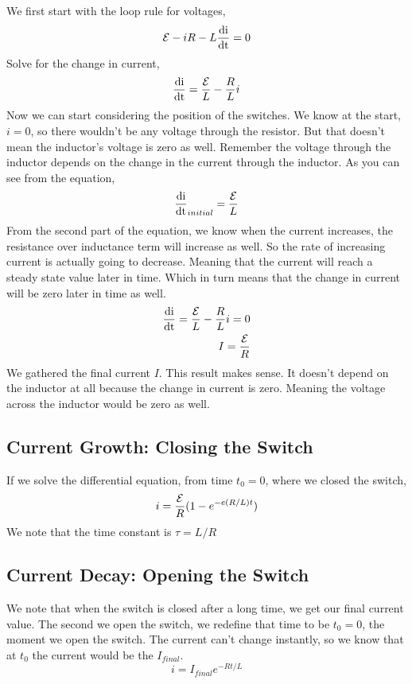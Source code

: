 We first start with the loop rule for voltages, 
\begin{equation*}
	\mathcal{E} - iR - L\frac{\mathrm{d i}}{\mathrm{d t}} = 0
\end{equation*}
Solve for the change in current, 
\begin{equation*}
	\frac{\mathrm{d i}}{\mathrm{d t}} = \frac{\mathcal{E}}{L} - \frac{R}{L}i
\end{equation*}
Now we can start considering the position of the switches. We know at the start, $i=0$, so there wouldn't be any voltage through the resistor. But that doesn't mean the inductor's voltage is zero as well. Remember the voltage through the inductor depends on the change in the current through the inductor. As you can see from the equation, 
\begin{equation*}
	\frac{\mathrm{d i}}{\mathrm{d t}}_{initial} = \frac{\mathcal{E}}{L}
\end{equation*}
From the second part of the equation, we know when the current increases, the resistance over inductance term will increase as well. So the rate of increasing current is actually going to decrease. Meaning that the current will reach a steady state value later in time. Which in turn means that the change in current will be zero later in time as well.
\begin{align*}
	\frac{\mathrm{d i}}{\mathrm{d t}} = \frac{\mathcal{E}}{L} - \frac{R}{L}i = 0 \\ 
	I = \frac{\mathcal{E}}{R}
\end{align*}
We gathered the final current $I$. This result makes sense. It doesn't depend on the inductor at all because the change in current is zero. Meaning the voltage across the inductor would be zero as well. 


\subsection{Current Growth: Closing the Switch}
If we solve the differential equation, from time $t_0 = 0$, where we closed the switch,
\begin{equation*}
	i = \frac{\mathcal{E}}{R}(1-e^{-e(R/L)t})
\end{equation*}
We note that the time constant is $\tau=L/R$

\subsection{Current Decay: Opening the Switch}
We note that when the switch is closed after a long time, we get our final current value. The second we open the switch, we redefine that time to be $t_0 = 0$, the moment we open the switch. The current can't change instantly, so we know that at $t_0$ the current would be the $I_{final}$.
\begin{equation*}
	i = I_{final}e^{-Rt/L}
\end{equation*}

